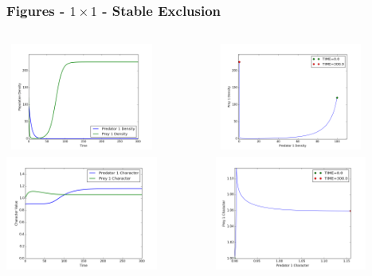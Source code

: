\documentclass[10pt]{beamer}
\begin{document}
\begin{frame}
	\frametitle{Figures - $1\times1$ - Stable Exclusion}
	\begin{columns}[t]
		\begin{column}{.5\textwidth}
			\centering
			\includegraphics[width=5cm,height=3.5cm]{figures/1x1/variable_growth/stable_exclusion/densities.png}\\
			\includegraphics[width=5cm,height=4cm]{figures/1x1/variable_growth/stable_exclusion/traits.png}
		\end{column}
		\begin{column}{.5\textwidth}
			\centering
			\includegraphics[width=5cm,height=3.5cm]{figures/1x1/variable_growth/stable_exclusion/density_phase_plane.png}\\
			\includegraphics[width=5cm,height=4cm]{figures/1x1/variable_growth/stable_exclusion/trait_phase_plane.png}
		\end{column}
	\end{columns}
\end{frame}
\end{document}
